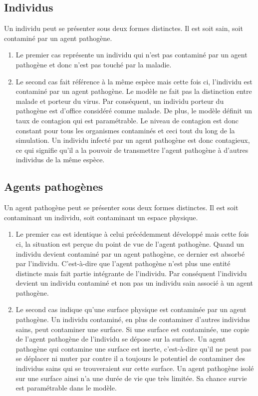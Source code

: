 \subsection{Individus}

Un individu peut se présenter sous deux formes distinctes. Il est soit sain, soit contaminé par un agent pathogène.\\

\begin{enumerate}
	\item Le premier cas représente un individu qui n'est pas contaminé par un agent pathogène et donc n'est pas touché par la maladie.
	\item Le second cas fait référence à la même espèce mais cette fois ci, l'individu est contaminé par un agent pathogène. Le modèle ne fait pas la distinction entre malade et porteur du virus. Par conséquent, un individu porteur du pathogène est d'office considéré comme malade. De plus, le modèle définit un taux de contagion qui est paramétrable. Le niveau de contagion est donc constant pour tous les organismes contaminés et ceci tout du long de la simulation. Un individu infecté par un agent pathogène est donc contagieux, ce qui signifie qu'il a la pouvoir de transmettre l'agent pathogène à d'autres individus de la même espèce.
\end{enumerate}

\subsection{Agents pathogènes}

Un agent pathogène peut se présenter sous deux formes distinctes. Il est soit contaminant un individu, soit contaminant un espace physique.

\begin{enumerate}
\item Le premier cas est identique à celui précédemment développé mais cette fois ci, la situation est perçue du point de vue de l'agent pathogène. Quand un individu devient contaminé par un agent pathogène, ce dernier est absorbé par l'individu. C'est-à-dire que l'agent pathogène n'est plus une entité distincte mais fait partie intégrante de l'individu. Par conséquent l'individu devient un individu contaminé et non pas un individu sain associé à un agent pathogène.
\item Le second cas indique qu'une surface physique est contaminée par un agent pathogène. Un individu contaminé, en plus de contaminer d'autres individus sains, peut contaminer une surface. Si une surface est contaminée, une copie de l'agent pathogène de l'individu se dépose sur la surface. Un agent pathogène qui contamine une surface est inerte, c'est-à-dire qu'il ne peut pas se déplacer ni muter par contre il a toujours le potentiel de contaminer des individus sains qui se trouveraient sur cette surface. Un agent pathogène isolé sur une surface ainsi n'a une durée de vie que très limitée. Sa chance survie est paramétrable dans le modèle.
\end{enumerate}

